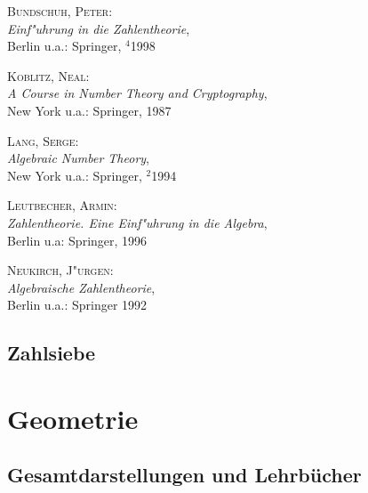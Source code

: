 \begin{description}

\item \textsc{Bundschuh, Peter}: \\ 
\textit{Einf"uhrung in die Zahlentheorie}, \\
Berlin u.a.: Springer, $^4$1998

\item \textsc{Koblitz, Neal}: \\ 
\textit{A Course in Number Theory and Cryptography}, \\ 
New York u.a.: Springer, 1987

\item \textsc{Lang, Serge}: \\ 
\textit{Algebraic Number Theory}, \\
New York u.a.: Springer, $^2$1994

\item \textsc{Leutbecher, Armin}: \\ 
\textit{Zahlentheorie. Eine Einf"uhrung in die Algebra}, \\ 
Berlin u.a: Springer, 1996

\item \textsc{Neukirch, J"urgen}: \\ 
\textit{Algebraische Zahlentheorie}, \\
Berlin u.a.: Springer 1992

\end{description}

\subsection{Zahlsiebe}


\section{Geometrie}

\subsection{Gesamtdarstellungen und Lehrb\"ucher}

